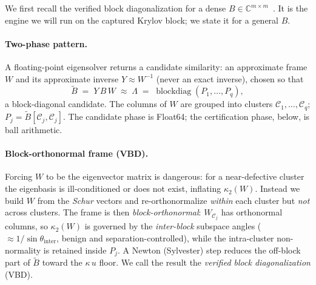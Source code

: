 \documentclass[11pt]{article}
\newcommand{\C}{\mathbb{C}}
\begin{document}
We first recall the verified block diagonalization for a dense $B\in\C^{m\times m}$~\cite{Rump2022,Miyajima2014}. It is the engine
we will run on the captured Krylov block; we state it for a general $B$.

\paragraph{Two-phase pattern.} A floating-point eigensolver returns a candidate similarity: an
approximate frame $W$ and its approximate inverse $Y\approx W^{-1}$ (never an exact inverse), chosen
so that
\begin{equation}\label{eq:Atilde}
  \widetilde B \;=\; Y\,B\,W \;\approx\; \Lambda \;=\; \operatorname{blockdiag}(P_1,\dots,P_q),
\end{equation}
a block-diagonal candidate. The columns of $W$ are grouped into clusters $\mathcal C_1,\dots,\mathcal C_q$;
$P_j=\widetilde B[\mathcal C_j,\mathcal C_j]$. The candidate phase is Float64; the certification phase,
below, is ball arithmetic.

\paragraph{Block-orthonormal frame (VBD).} Forcing $W$ to be the eigenvector matrix is dangerous: for
a near-defective cluster the eigenbasis is ill-conditioned or does not exist, inflating $\kappa_2(W)$.
Instead we build $W$ from the \emph{Schur} vectors and re-orthonormalize \emph{within} each cluster
but \emph{not} across clusters. The frame is then \emph{block-orthonormal}: $W_{\mathcal C_j}$ has
orthonormal columns, so $\kappa_2(W)$ is governed by the \emph{inter-block} subspace angles
($\approx 1/\sin\theta_{\mathrm{inter}}$, benign and separation-controlled), while the intra-cluster
non-normality is retained inside $P_j$. A Newton (Sylvester) step reduces the off-block part of
$\widetilde B$ toward the $\kappa\,u$ floor. We call the result the \emph{verified block
diagonalization} (VBD).
\end{document}
